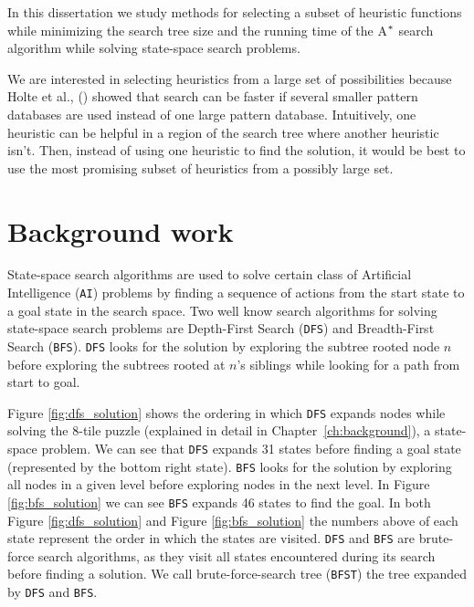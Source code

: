 In this dissertation we study methods for selecting a subset of heuristic functions while minimizing the search tree size and the running time of the A$\sp{*}$ \cite{hart1968formal} search algorithm while solving state-space search problems.

We are interested in selecting heuristics from a large set of possibilities because Holte et al., (\citeyear{holte2006maximizing}) showed that search can be faster if several smaller pattern databases are used instead of one large pattern database. %
Intuitively, one heuristic can be helpful in a region of the search tree where another heuristic isn't. Then, instead of using one heuristic to find the solution, it would be best to use the most promising subset of heuristics from a possibly large set.

\section{Background work}
\noindent
State-space search algorithms are used to solve certain class of Artificial Intelligence (\texttt{AI}) problems by finding a sequence of actions from the start state to a goal state in the search space. Two well know search algorithms for solving state-space search problems are Depth-First Search (\texttt{DFS}) and Breadth-First Search (\texttt{BFS}). \texttt{DFS} looks for the solution by exploring the subtree rooted node $n$ before exploring the subtrees rooted at $n$'s siblings while looking for a path from start to goal. 

Figure \ref{fig:dfs_solution} shows the ordering in which \texttt{DFS} expands nodes while solving the 8-tile puzzle (explained in detail in Chapter~\ref{ch:background}), a state-space problem. We can see that \texttt{DFS} expands 31 states before finding a goal state (represented by the bottom right state). \texttt{BFS} looks for the solution by exploring all nodes in a given level before exploring nodes in the next level. In Figure \ref{fig:bfs_solution} we can see \texttt{BFS} expands 46 states to find the goal. In both Figure \ref{fig:dfs_solution} and Figure \ref{fig:bfs_solution} the numbers above of each state represent the order in which the states are visited. \texttt{DFS} and \texttt{BFS} are brute-force search algorithms, as they visit all states encountered during its search before finding a solution. %
We call brute-force-search tree (\texttt{BFST}) the tree expanded by \texttt{DFS} and \texttt{BFS}.


